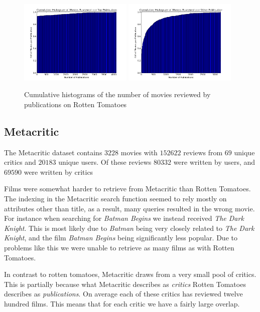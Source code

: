 \documentclass[12pt]{article}
\begin{document}
	 \begin{figure}[H]
	    \centering
	    \includegraphics[width=0.48\textwidth]{plots/plot_r_pub_top.png}
	    \includegraphics[width=0.48\textwidth]{plots/plot_r_pub_oth.png}
	    \caption{Cumulative histograms of the number of movies reviewed by publications on Rotten Tomatoes}
	    \label{fig:r_pub}
	\end{figure}

\subsection{Metacritic}

	The Metacritic dataset contains $3228$ movies with $152622$ reviews from $69$ unique critics and $20183$ unique users. Of these reviews $80332$ were written by users, and $69590$ were written by critics


	Films were somewhat harder to retrieve from Metacritic than Rotten Tomatoes. The indexing in the Metacritic search function seemed to rely mostly on attributes other than title, as a result, many queries resulted in the wrong movie. For instance when searching for \textit{Batman Begins} we instead received \textit{The Dark Knight}. This is most likely due to \textit{Batman} being very closely related to \textit{The Dark Knight}, and the film \textit{Batman Begins} being significantly less popular. Due to problems like this we were unable to retrieve as many films as with Rotten Tomatoes.

	In contrast to rotten tomatoes, Metacritic draws from a very small pool of critics. This is partially because what Metacritic describes as \textit{critics} Rotten Tomatoes describes as \textit{publications}. On average each of these critics has reviewed twelve hundred films. This means that for each critic we have a fairly large overlap.
\end{document}
